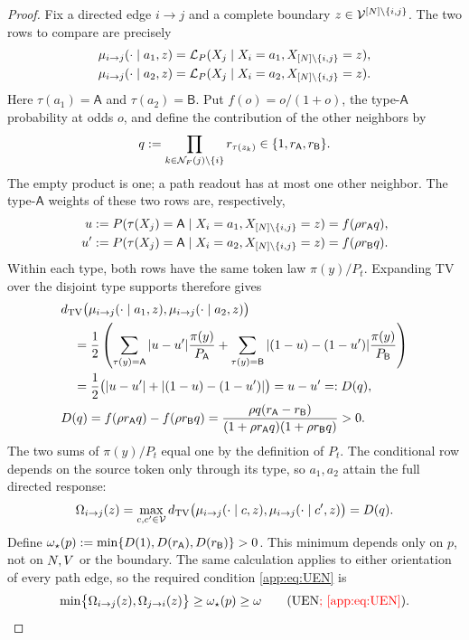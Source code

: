 \begin{proof}
Fix a directed edge $i\to j$ and a complete boundary
$z\in\mathcal V^{[N]\setminus\{i,j\}}$.
The two rows to compare are precisely
\begin{align*}
 \mu_{i\to j}(\cdot\mid a_1,z)
 &=\mathcal L_P(X_j\mid X_i=a_1,X_{[N]\setminus\{i,j\}}=z),\\
 \mu_{i\to j}(\cdot\mid a_2,z)
 &=\mathcal L_P(X_j\mid X_i=a_2,X_{[N]\setminus\{i,j\}}=z).
\end{align*}
Here $\tau(a_1)=\mathsf A$ and $\tau(a_2)=\mathsf B$.
Put $f(o)=o/(1+o)$, the type-$\mathsf A$ probability at odds $o$, and
define the contribution of the other neighbors by
\[
 q:=\prod_{k\in\mathcal N_F(j)\setminus\{i\}}r_{\tau(z_k)}
 \in\{1,r_{\mathsf A},r_{\mathsf B}\}.
\]
The empty product is one; a path readout has at most one other neighbor.
The type-$\mathsf A$ weights of these two rows are, respectively,
\begin{align*}
 u&:=P(\tau(X_j)=\mathsf A\mid X_i=a_1,X_{[N]\setminus\{i,j\}}=z)
       =f(\rho r_{\mathsf A} q),\\
 u'&:=P(\tau(X_j)=\mathsf A\mid X_i=a_2,X_{[N]\setminus\{i,j\}}=z)
       =f(\rho r_{\mathsf B} q).
\end{align*}
Within each type, both rows have the same token law $\pi(y)/P_t$.
Expanding TV over the disjoint type supports therefore gives
\begin{align*}
 &d_{\mathrm{TV}}\bigl(\mu_{i\to j}(\cdot\mid a_1,z),
             \mu_{i\to j}(\cdot\mid a_2,z)\bigr)\\
 &\quad=\frac12\left(
    \sum_{\tau(y)=\mathsf A}|u-u'|\frac{\pi(y)}{P_{\mathsf A}}
   +\sum_{\tau(y)=\mathsf B}|(1-u)-(1-u')|
                            \frac{\pi(y)}{P_{\mathsf B}}\right)\\
 &\quad=\frac12\bigl(|u-u'|+|(1-u)-(1-u')|\bigr)
 =u-u'=:D(q),\\
 &D(q)=f(\rho r_{\mathsf A} q)-f(\rho r_{\mathsf B} q)
 =\frac{\rho q(r_{\mathsf A}-r_{\mathsf B})}
        {(1+\rho r_{\mathsf A} q)(1+\rho r_{\mathsf B} q)}>0.
\end{align*}
The two sums of $\pi(y)/P_t$ equal one by the definition of $P_t$.
The conditional row depends on the source token only through its type,
so $a_1,a_2$ attain the full directed response:
\[
 \Omega_{i\to j}(z)
 =\max_{c,c'\in\mathcal V}
   d_{\mathrm{TV}}\bigl(\mu_{i\to j}(\cdot\mid c,z),
              \mu_{i\to j}(\cdot\mid c',z)\bigr)
 =D(q).
\]
Define
$\omega_\star(p):=\min\{D(1),D(r_{\mathsf A}),D(r_{\mathsf B})\}>0$.
This minimum depends only on $p$, not on $N,V$ or the boundary.
The same calculation applies to either orientation of every path edge,
so the required condition \eqref{app:eq:UEN} is
\[
 \min\bigl\{\DirectedResponse{i}{j}{z},
             \DirectedResponse{j}{i}{z}\bigr\}
 \ge\omega_\star(p)\ge\EdgeSignal
 \qquad\text{(UEN\textcolor{red}{; \cref{app:eq:UEN}})}.
\]


\end{proof}
